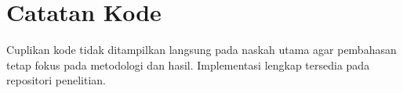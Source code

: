 \section{Catatan Kode}

Cuplikan kode tidak ditampilkan langsung pada naskah utama agar pembahasan tetap fokus pada metodologi dan hasil. Implementasi lengkap tersedia pada repositori penelitian.
